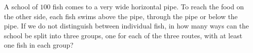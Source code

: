 A school of $100$ fish comes to a very wide horizontal pipe. To reach the food on the other side, each fish swims above the pipe, through the pipe or below the pipe. If we do not distinguish between individual fish, in how many ways can the school be split into three groups, one for each of the three routes, with at least one fish in each group?
